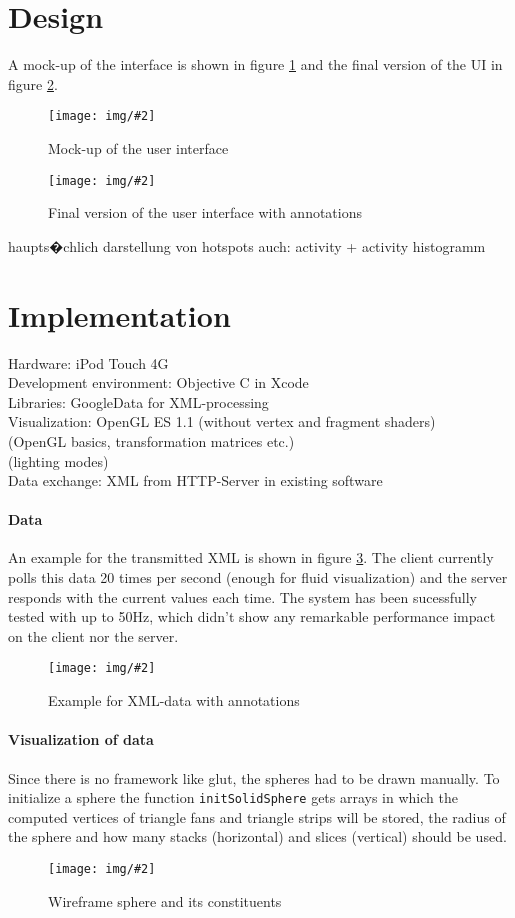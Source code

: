 \documentclass{scrartcl}
\newcommand{\red}[1]{{\color{red} #1}}
\newcommand{\graphic}[3][width=\linewidth] %
{
  \begin{figure}[ht]
    \centering
    \texttt{[image: img/\#2]}
    \caption{#3}
    \label{fig:#2}
  \end{figure}
}
\newcommand{\refFigure}[1]{figure \ref{fig:#1}}
\begin{document}
\section{Design}
A mock-up of the interface is shown in \refFigure{mockup} and the final version of the UI in \refFigure{screen-annotated}.
\graphic[scale=.5]{mockup}{Mock-up of the user interface}
\graphic[scale=.5]{screen-annotated}{Final version of the user interface with annotations}
\red{haupts�chlich darstellung von hotspots
auch: activity + activity histogramm}



\section{Implementation}
Hardware: iPod Touch 4G\\
Development environment: Objective C in Xcode\\
Libraries: GoogleData for XML-processing\\
Visualization: OpenGL ES 1.1 (without vertex and fragment shaders)\\
\red{(OpenGL basics, transformation matrices etc.)\\
(lighting modes)}\\
Data exchange: XML from HTTP-Server in existing software\\

\paragraph*{Data}
An example for the transmitted XML is shown in \refFigure{data}. The client currently polls this data 20 times per second (enough for fluid visualization) and the server responds with the current values each time. The system has been sucessfully tested with up to 50Hz, which didn't show any remarkable performance impact on the client nor the server.
\graphic[scale=.5]{data}{Example for XML-data with annotations}

\paragraph*{Visualization of data}
Since there is no framework like glut, the spheres had to be drawn manually. To initialize a sphere the function \verb|initSolidSphere| gets arrays in which the computed vertices of triangle fans and triangle strips will be stored, the radius of the sphere and how many stacks (horizontal) and slices (vertical) should be used.
\graphic[scale=.5]{sphere}{Wireframe sphere and its constituents}
\end{document}
